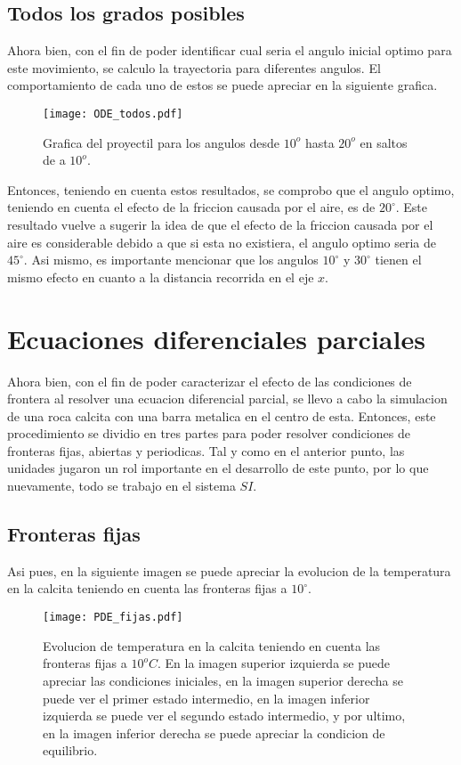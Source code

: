 \documentclass[11pt]{article}
\begin{document}
	\subsection{Todos los grados posibles}
		Ahora bien, con el fin de poder identificar cual seria el angulo inicial optimo para este movimiento, se calculo la trayectoria para diferentes angulos. El comportamiento de cada uno 			de estos se puede apreciar en la siguiente grafica.
		\begin{figure}[H]
    			\centering
    				\texttt{[image: ODE\_todos.pdf]}
    				\caption{Grafica del proyectil para los angulos desde $10^o$ hasta $20^o$ en saltos de a $10^o$.}
    			\label{fig:todos}
		\end{figure}

		Entonces, teniendo en cuenta estos resultados, se comprobo que el angulo optimo, teniendo en cuenta el efecto de la friccion causada por el aire, es de $20^\circ$. Este resultado 			vuelve a sugerir la idea de que el efecto de la friccion causada por el aire es considerable debido a que si esta no existiera, el angulo optimo seria de $45^\circ$. Asi mismo, es 			importante mencionar que los angulos $10^\circ$ y $30^\circ$ tienen el mismo efecto en cuanto a la distancia recorrida en el eje $x$.


\section{Ecuaciones diferenciales parciales}

Ahora bien, con el fin de poder caracterizar el efecto de las condiciones de frontera al resolver una ecuacion diferencial parcial, se llevo a cabo la simulacion de una roca calcita con una barra metalica en el centro de esta. Entonces, este procedimiento se dividio en tres partes para poder resolver condiciones de fronteras fijas, abiertas y periodicas. Tal y como en el anterior punto, las unidades jugaron un rol importante en el desarrollo de este punto, por lo que nuevamente, todo se trabajo en el sistema $SI$.
	\subsection{Fronteras fijas}

		Asi pues, en la siguiente imagen se puede apreciar la evolucion de la temperatura en la calcita teniendo en cuenta las fronteras fijas a $10^\circ$. 
		\begin{figure}[H]
    			\centering
    				\texttt{[image: PDE\_fijas.pdf]}
    				\caption{Evolucion de temperatura en la calcita teniendo en cuenta las fronteras fijas a $10^o C$. En la imagen superior izquierda se puede apreciar las condiciones 						iniciales, en la imagen superior derecha se puede ver el primer estado intermedio, en la imagen inferior izquierda se puede ver el segundo estado intermedio, y 					por ultimo, en la imagen inferior derecha se puede apreciar la condicion de equilibrio.}
    			\label{fig:fijas}
		\end{figure}
\end{document}
